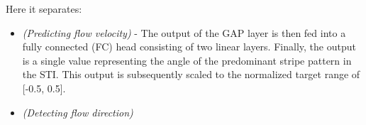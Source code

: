 \documentclass[12pt]{elsarticle}
\begin{document}
Here it separates:
\begin{itemize}
    \item \textit{(Predicting flow velocity)} - The output of the GAP layer is then fed into a fully connected (FC) head consisting of two linear layers. Finally, the output is a single value representing the angle of the predominant stripe pattern in the STI. This output is subsequently scaled to the normalized target range of [-0.5, 0.5].
    \item \textit{(Detecting flow direction)}
\end{itemize}


\begin{table}[!htbp]
    \centering
    \caption{CNN Architecture for Angle Prediction from STI Images.}
    \label{tab:cnn_architecture_condensed}
\end{table}
\end{document}
